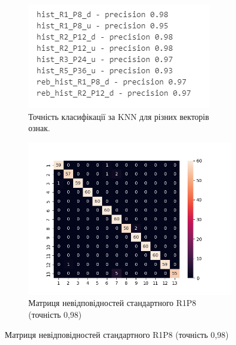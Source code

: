 \begin{figure}[h]
    \begin{subfigure}{0.5\textwidth}
    \includegraphics[width=0.95\linewidth]{img/precision-2.png} 
    \caption{
        Точність класифікації за KNN для різних векторів ознак.
    }
    \end{subfigure}%
    \begin{subfigure}{0.5\textwidth}
    \includegraphics[width=0.95\linewidth]{img/confusion/knn-hist_R1_P8_d.png}
    \caption{
        Матриця невідповідностей стандартного R1P8 (точність 0,98)
    }
    \end{subfigure}


\end{figure}
